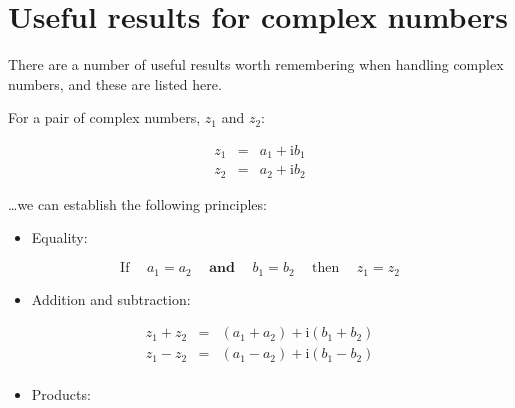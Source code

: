 \documentclass[
]{book}
\providecommand{\tightlist}{%
  \setlength{\itemsep}{0pt}\setlength{\parskip}{0pt}}
\begin{document}
\hypertarget{sec:ch3-complexusefulresults}{%
\section{Useful results for complex numbers}\label{sec:ch3-complexusefulresults}}

There are a number of useful results worth remembering when handling complex numbers, and these are listed here.

For a pair of complex numbers, \(z_1\) and \(z_2\):

\begin{equation}
\begin{array}{rcl}
z_1 &=& a_1 + \mathrm{i}b_1 \\
z_2 &=& a_2 + \mathrm{i}b_2 
\end{array}
\label{eq:ch3-complexnumber4}
\end{equation}

\ldots we can establish the following principles:

\begin{itemize}
\tightlist
\item
  Equality:
\end{itemize}

\begin{equation}
\textrm{If} \hspace{15pt} a_1 = a_2 \hspace{15pt} \textbf{and} \hspace{15pt} b_1 = b_2  \hspace{15pt} \textrm{then}  \hspace{15pt} z_1 = z_2
\end{equation}

\begin{itemize}
\tightlist
\item
  Addition and subtraction:
\end{itemize}

\begin{equation}
\begin{array}{rcl}
z_1 + z_2 &=& (a_1 + a_2) + \mathrm{i}(b_1 + b_2) \\
z_1 - z_2 &=& (a_1 - a_2) + \mathrm{i}(b_1 - b_2) \\
\end{array}
\end{equation}

\begin{itemize}
\tightlist
\item
  Products:
\end{itemize}
\end{document}
